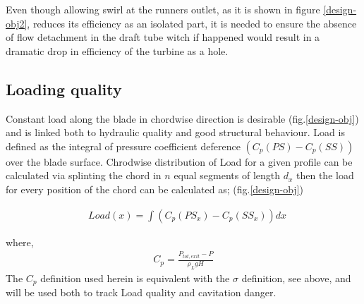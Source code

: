 Even though allowing swirl at the runners outlet, as it is shown in figure \ref{design-obj2}, reduces its efficiency as an isolated part, it is needed to ensure the absence of flow detachment in the draft tube witch if happened would result in a dramatic drop in efficiency of the turbine as a hole.  



\subsection{Loading quality}
Constant load along the blade in chordwise direction is desirable (fig.\ref{design-obj}) and is linked both to hydraulic quality and good structural behaviour. Load is defined as the integral of pressure coefficient deference $(C_p(PS)-C_p(SS))$ over the blade surface. Chrodwise distribution of Load for a given profile can be calculated via splinting the chord in $n$ equal segments of length $d_x$ then the load for every position of the chord can be calculated as; (fig.\ref{design-obj})     

\begin{align} 
   & Load(x)=\int (C_p(PS_x)-C_p(SS_x)) dx 
\label{load}
\end{align}

where,
\begin{eqnarray}
		C_p=\frac{P_{tot,exit}-P}{\rho_{L}gH}
\label{Cpdef}
\end{eqnarray}
The $C_p$ definition used herein is equivalent with the $\sigma$ definition, see above, and will be used both to track Load quality and cavitation danger.  
  

